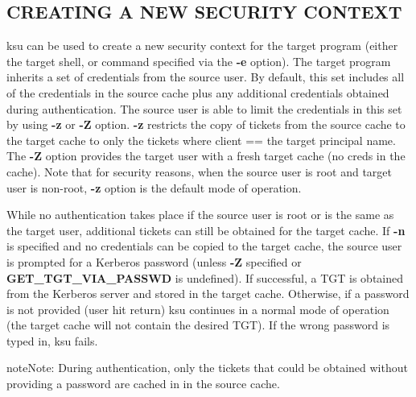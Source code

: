 \documentclass[letterpaper,10pt,english]{sphinxmanual}
\begin{document}
\subsection{CREATING A NEW SECURITY CONTEXT}
\label{user/user_commands/ksu:creating-a-new-security-context}
ksu can be used to create a new security context for the target
program (either the target shell, or command specified via the \textbf{-e}
option).  The target program inherits a set of credentials from the
source user.  By default, this set includes all of the credentials in
the source cache plus any additional credentials obtained during
authentication.  The source user is able to limit the credentials in
this set by using \textbf{-z} or \textbf{-Z} option.  \textbf{-z} restricts the copy
of tickets from the source cache to the target cache to only the
tickets where client == the target principal name.  The \textbf{-Z} option
provides the target user with a fresh target cache (no creds in the
cache).  Note that for security reasons, when the source user is root
and target user is non-root, \textbf{-z} option is the default mode of
operation.

While no authentication takes place if the source user is root or is
the same as the target user, additional tickets can still be obtained
for the target cache.  If \textbf{-n} is specified and no credentials can
be copied to the target cache, the source user is prompted for a
Kerberos password (unless \textbf{-Z} specified or \textbf{GET\_TGT\_VIA\_PASSWD}
is undefined).  If successful, a TGT is obtained from the Kerberos
server and stored in the target cache.  Otherwise, if a password is
not provided (user hit return) ksu continues in a normal mode of
operation (the target cache will not contain the desired TGT).  If the
wrong password is typed in, ksu fails.

\begin{notice}{note}{Note:}
During authentication, only the tickets that could be
obtained without providing a password are cached in in the
source cache.
\end{notice}
\end{document}
